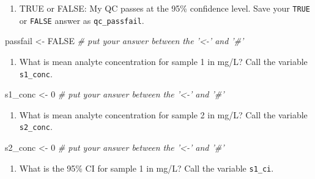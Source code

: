 \documentclass[]{tufte-book}
\newenvironment{Shaded}{}{}
\newcommand{\CommentTok}[1]{\textcolor[rgb]{0.38,0.63,0.69}{\textit{#1}}}
\newcommand{\DecValTok}[1]{\textcolor[rgb]{0.25,0.63,0.44}{#1}}
\newcommand{\NormalTok}[1]{#1}
\newcommand{\OtherTok}[1]{\textcolor[rgb]{0.00,0.44,0.13}{#1}}
\newcommand{\StringTok}[1]{\textcolor[rgb]{0.25,0.44,0.63}{#1}}
\providecommand{\tightlist}{%
  \setlength{\itemsep}{0pt}\setlength{\parskip}{0pt}}
\begin{document}
\begin{enumerate}
\def\labelenumi{\arabic{enumi}.}
\setcounter{enumi}{4}
\tightlist
\item
  TRUE or FALSE: My QC passes at the 95\% confidence level. Save your \texttt{TRUE} or \texttt{FALSE} answer as \texttt{qc\_passfail}.
\end{enumerate}

\begin{Shaded}
\begin{Highlighting}[]
\NormalTok{passfail <-}\StringTok{ }\OtherTok{FALSE}     \CommentTok{# put your answer between the '<-' and '#'}
\end{Highlighting}
\end{Shaded}

\begin{enumerate}
\def\labelenumi{\arabic{enumi}.}
\setcounter{enumi}{5}
\tightlist
\item
  What is mean analyte concentration for sample 1 in mg/L? Call the variable \texttt{s1\_conc}.
\end{enumerate}

\begin{Shaded}
\begin{Highlighting}[]
\NormalTok{s1_conc <-}\StringTok{ }\DecValTok{0}     \CommentTok{# put your answer between the '<-' and '#'}
\end{Highlighting}
\end{Shaded}

\begin{enumerate}
\def\labelenumi{\arabic{enumi}.}
\setcounter{enumi}{6}
\tightlist
\item
  What is mean analyte concentration for sample 2 in mg/L? Call the variable \texttt{s2\_conc}.
\end{enumerate}

\begin{Shaded}
\begin{Highlighting}[]
\NormalTok{s2_conc <-}\StringTok{ }\DecValTok{0}     \CommentTok{# put your answer between the '<-' and '#'}
\end{Highlighting}
\end{Shaded}

\begin{enumerate}
\def\labelenumi{\arabic{enumi}.}
\setcounter{enumi}{7}
\tightlist
\item
  What is the 95\% CI for sample 1 in mg/L? Call the variable \texttt{s1\_ci}.
\end{enumerate}
\end{document}
